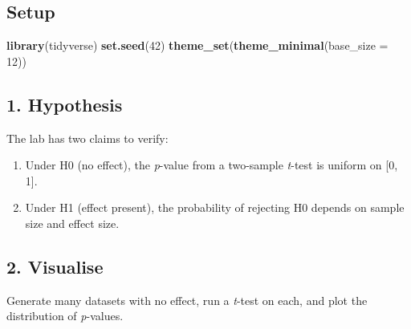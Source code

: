 \documentclass[
]{article}
\newenvironment{Shaded}{\begin{snugshade}}{\end{snugshade}}
\newcommand{\AttributeTok}[1]{\textcolor[rgb]{0.13,0.29,0.53}{#1}}
\newcommand{\DecValTok}[1]{\textcolor[rgb]{0.00,0.00,0.81}{#1}}
\newcommand{\ErrorTok}[1]{\textcolor[rgb]{0.64,0.00,0.00}{\textbf{#1}}}
\newcommand{\FunctionTok}[1]{\textcolor[rgb]{0.13,0.29,0.53}{\textbf{#1}}}
\newcommand{\NormalTok}[1]{#1}
\newcommand{\OtherTok}[1]{\textcolor[rgb]{0.56,0.35,0.01}{#1}}
\newcommand{\SpecialCharTok}[1]{\textcolor[rgb]{0.81,0.36,0.00}{\textbf{#1}}}
\providecommand{\tightlist}{%
  \setlength{\itemsep}{0pt}\setlength{\parskip}{0pt}}
\begin{document}
\subsection{Setup}\label{setup}

\begin{Shaded}
\begin{Highlighting}[]
\FunctionTok{library}\NormalTok{(tidyverse)}
\FunctionTok{set.seed}\NormalTok{(}\DecValTok{42}\NormalTok{)}
\FunctionTok{theme\_set}\NormalTok{(}\FunctionTok{theme\_minimal}\NormalTok{(}\AttributeTok{base\_size =} \DecValTok{12}\NormalTok{))}
\end{Highlighting}
\end{Shaded}

\subsection{1. Hypothesis}\label{hypothesis}

The lab has two claims to verify:

\begin{enumerate}
\def\labelenumi{\arabic{enumi}.}
\tightlist
\item
  Under H0 (no effect), the \emph{p}-value from a two-sample
  \emph{t}-test is uniform on {[}0, 1{]}.
\item
  Under H1 (effect present), the probability of rejecting H0 depends on
  sample size and effect size.
\end{enumerate}

\subsection{2. Visualise}\label{visualise}

Generate many datasets with no effect, run a \emph{t}-test on each, and
plot the distribution of \emph{p}-values.

\begin{Shaded}
\end{Shaded}
\end{document}
